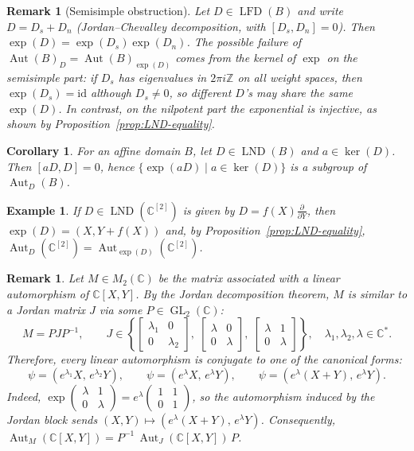 \documentclass[11pt,a4paper,reqno]{amsart}
\newtheorem{corollary}[theorem]{Corollary}
\newtheorem{remark}[theorem]{Remark}}
\newtheorem{example}[theorem]{Example}
\newcommand{\Aut}[0]{\ensuremath{\operatorname{Aut}}}
\begin{document}
\begin{remark}[Semisimple obstruction]
Let $D\in\operatorname{LFD}(B)$ and write $D=D_s+D_n$ (Jordan--Chevalley decomposition, with $[D_s,D_n]=0$).
Then $\exp(D)=\exp(D_s)\exp(D_n)$.
The possible failure of $\Aut(B)_D=\Aut(B)_{\exp(D)}$ comes from the kernel of $\exp$ on the semisimple part: if $D_s$ has eigenvalues in $2\pi i\mathbb{Z}$ on all weight spaces, then $\exp(D_s)=\mathrm{id}$ although $D_s\neq0$, so different $D$'s may share the same $\exp(D)$. In contrast, on the nilpotent part the exponential is injective, as shown by Proposition~\ref{prop:LND-equality}.
\end{remark}
 
 
\begin{corollary}\label{cor:ker-subgroup}
For an affine domain $B$, let $D\in \operatorname{LND}(B)$ and $a\in \ker(D)$. Then $[aD,D]=0$, 
hence $\{\exp(aD)\mid a\in \ker(D)\}$ is a subgroup of $\operatorname{Aut}_D(B)$. 
\end{corollary}
 
\begin{example}
    If $D\in \operatorname{LND}(\mathbb{C}^{[2]})$ is given by $D=f(X)\frac{\partial}{\partial Y}$, then $\exp(D)=(X, Y+f(X))$ and, by Proposition~\ref{prop:LND-equality}, $\operatorname{Aut}_D(\mathbb{C}^{[2]})=\operatorname{Aut}_{\exp(D)}(\mathbb{C}^{[2]})$.
\end{example}
 
 
\begin{remark}\label{rem:Jordan}
Let $M \in M_{2}(\mathbb{C})$ be the matrix associated with a linear automorphism of $\mathbb{C}[X,Y]$.  
By the Jordan decomposition theorem, $M$ is similar to a Jordan matrix $J$ via some $P \in \operatorname{GL}_{2}(\mathbb{C})$:
\[
M = PJP^{-1}, \qquad 
J \in \left\{
\begin{bmatrix}\lambda_1 & 0 \\ 0 & \lambda_2 \end{bmatrix},\;
\begin{bmatrix}\lambda & 0 \\ 0 & \lambda \end{bmatrix},\;
\begin{bmatrix}\lambda & 1 \\ 0 & \lambda \end{bmatrix}
\right\}, \quad \lambda_1,\lambda_2,\lambda \in \mathbb{C}^*.
\]
Therefore, every linear automorphism is conjugate to one of the canonical forms:
\[
\psi = (e^{\lambda_1}X,\, e^{\lambda_2}Y), 
\qquad 
\psi = (e^{\lambda}X,\, e^{\lambda}Y),
\qquad 
\psi = (e^{\lambda}(X+ Y),\, e^{\lambda}Y).
\]
Indeed, $\exp\!\begin{pmatrix}\lambda & 1 \\ 0 & \lambda\end{pmatrix} = e^\lambda\begin{pmatrix}1 & 1 \\ 0 & 1\end{pmatrix}$, so the automorphism induced by the Jordan block sends $(X,Y)\mapsto(e^\lambda(X+Y),\, e^\lambda Y)$.
Consequently, $\operatorname{Aut}_M(\mathbb{C}[X,Y]) = P^{-1}\,\operatorname{Aut}_J(\mathbb{C}[X,Y])\,P$.
\end{remark}
 
\end{document}
